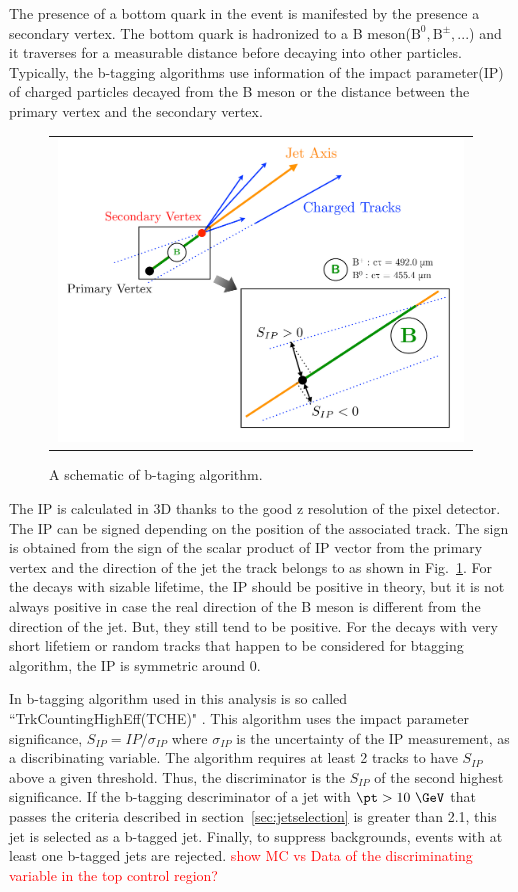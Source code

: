 The presence of a bottom quark in the event is manifested by the presence a secondary vertex. 
The bottom quark is hadronized to a B meson($\textrm{B}^0, \textrm{B}^\pm, ...$) and it 
traverses for a measurable distance before decaying into other particles.
Typically, the b-tagging algorithms use information of the impact parameter(IP) of 
charged particles decayed from the B meson or the distance between the primary vertex 
and the secondary vertex. 
\begin{figure}[htp] 
\centering 
\begin{tabular}{c} 
\includegraphics[width=0.99\textwidth]{figures/Btag.pdf} 
\end{tabular} 
\caption{A schematic of b-taging algorithm.}
\label{fig:btag} 
\end{figure} 
The IP is calculated in 3D thanks to the good z resolution of the 
pixel detector. The IP can be signed depending on the position of 
the associated track. The sign is obtained from the sign of the scalar product of 
IP vector from the primary vertex and the direction of the jet the track belongs to
as shown in Fig.~\ref{fig:btag}.
For the decays with sizable lifetime, the IP should be positive in theory, 
but it is not always positive in case the real direction of the B meson 
is different from the direction of the jet. But, they still tend to be positive. 
For the decays with very short lifetiem or random tracks that happen to be 
considered for btagging algorithm, the IP is symmetric around 0.   

In b-tagging algorithm used in this analysis is so called ``TrkCountingHighEff(TCHE)" \cite{}.
This algorithm uses the impact parameter significance, $S_{IP} = IP / \sigma_{IP}$ 
where $\sigma_{IP}$ is the uncertainty of the IP measurement, 
as a discribinating variable. The algorithm requires at least 2 tracks to have $S_{IP}$ 
above a given threshold. Thus, the discriminator is the $S_{IP}$ of the second highest 
significance. 
If the b-tagging descriminator of a jet with $\pt>10~\GeV$ that passes the criteria described in
section~\ref{sec:jetselection} is greater than 2.1, this jet is selected as a b-tagged jet. 
Finally, to suppress \topbkg{} backgrounds, events with at least one b-tagged jets are rejected. 
\textcolor{red}{show MC vs Data of the discriminating variable in the top control region?}

